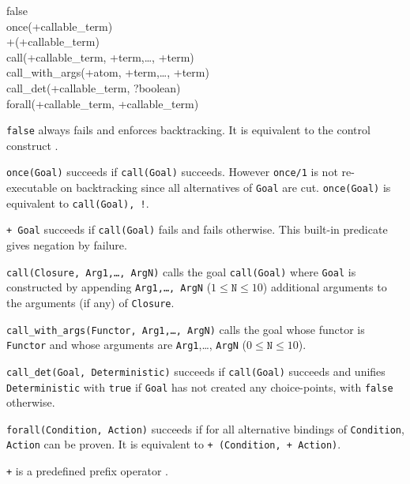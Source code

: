 \begin{TemplatesOneCol}
false\\
once(+callable\_term)\\
{\bs}+(+callable\_term) \\
call(+callable\_term, +term,\ldots, +term)\\
call\_with\_args(+atom, +term,\ldots, +term)\\
call\_det(+callable\_term, ?boolean) \\
forall(+callable\_term, +callable\_term)

\end{TemplatesOneCol}

\Description

\texttt{false} always fails and enforces backtracking. It is equivalent to the
 control construct .

\texttt{once(Goal)} succeeds if \texttt{call(Goal)} succeeds. However
\texttt{once/1} is not re-executable on backtracking since all alternatives
of \texttt{Goal} are cut. \texttt{once(Goal)} is equivalent to
\texttt{call(Goal), !}.

\texttt{{\bs}+ Goal} succeeds if \texttt{call(Goal)} fails and fails
otherwise. This built-in predicate gives negation by failure.

\texttt{call(Closure, Arg1,\ldots, ArgN)} calls the goal \texttt{call(Goal)}
where \texttt{Goal} is constructed by appending \texttt{Arg1,\ldots, ArgN}
($1 \leq \texttt{N} \leq 10$) additional arguments to the arguments (if any)
of \texttt{Closure}.

\texttt{call\_with\_args(Functor, Arg1,\ldots, ArgN)} calls the goal
whose functor is \texttt{Functor} and whose arguments are
\texttt{Arg1},\ldots, \texttt{ArgN} ($0 \leq \texttt{N} \leq 10$).

\texttt{call\_det(Goal, Deterministic)} succeeds if \texttt{call(Goal)}
succeeds and unifies \texttt{Deterministic} with \texttt{true} if
\texttt{Goal} has not created any choice-points, with \texttt{false}
otherwise.

\texttt{forall(Condition, Action)} succeeds if for all alternative bindings of
\texttt{Condition}, \texttt{Action} can be proven.
It is equivalent to \texttt{{\bs}+ (Condition, {\bs}+ Action)}.


\texttt{{\bs}+} is a predefined prefix operator .

